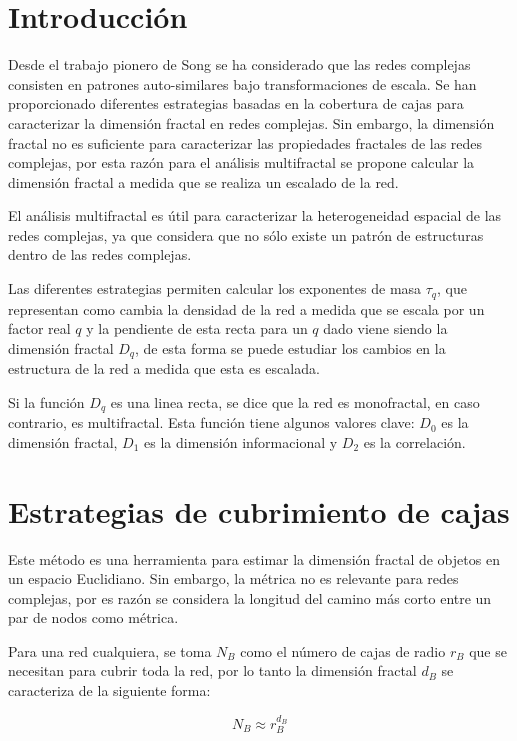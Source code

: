 \section{Introducción}

Desde el trabajo pionero de Song\cite{Song2005} se ha considerado que las redes complejas consisten en patrones auto-similares bajo transformaciones de escala. Se han proporcionado diferentes estrategias basadas en la cobertura de cajas para caracterizar la dimensión fractal en redes complejas. Sin embargo, la dimensión fractal no es suficiente para caracterizar las propiedades fractales de las redes complejas, por esta razón para el análisis multifractal se propone calcular la dimensión fractal a medida que se realiza un escalado de la red.

El análisis multifractal es útil para caracterizar la heterogeneidad espacial de las redes complejas, ya que considera que no sólo existe un patrón de estructuras dentro de las redes complejas.

Las diferentes estrategias permiten calcular los exponentes de masa $\tau_q$, que representan como cambia la densidad de la red a medida que se escala por un factor real $q$ y la pendiente de esta recta para un $q$ dado viene siendo la dimensión fractal $D_q$, de esta forma se puede estudiar los cambios en la estructura de la red a medida que esta es escalada.

Si la función $D_q$ es una linea recta, se dice que la red es monofractal, en caso contrario, es multifractal. Esta función tiene algunos valores clave\cite{Halsey1986}: $D_0$ es la dimensión fractal, $D_1$ es la dimensión  informacional y $D_2$ es la correlación.

\section{Estrategias de cubrimiento de cajas}

Este método es una herramienta para estimar la dimensión fractal de objetos en un espacio Euclidiano. Sin embargo, la métrica no es relevante para redes complejas, por es razón se considera la longitud del camino más corto entre un par de nodos como métrica. 

Para una red cualquiera, se toma $N_B$ como el número de cajas de radio $r_B$ que se necesitan para cubrir toda la red, por lo tanto la dimensión fractal $d_B$ se caracteriza de la siguiente forma:

\begin{equation}
    N_B \approx r_B^{d_B}
\end{equation}

